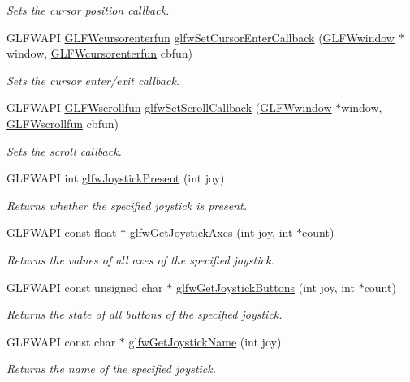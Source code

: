 \begin{DoxyCompactItemize}
\begin{DoxyCompactList}\small\item\em \-Sets the cursor position callback. \end{DoxyCompactList}\item 
\-G\-L\-F\-W\-A\-P\-I \hyperlink{group__input_ga762d898d9b0241d7e3e3b767c6cf318f}{\-G\-L\-F\-Wcursorenterfun} \hyperlink{group__input_gaa20014985561efeb2c53f1956f727830}{glfw\-Set\-Cursor\-Enter\-Callback} (\hyperlink{group__window_ga3c96d80d363e67d13a41b5d1821f3242}{\-G\-L\-F\-Wwindow} $\ast$window, \hyperlink{group__input_ga762d898d9b0241d7e3e3b767c6cf318f}{\-G\-L\-F\-Wcursorenterfun} cbfun)
\begin{DoxyCompactList}\small\item\em \-Sets the cursor enter/exit callback. \end{DoxyCompactList}\item 
\-G\-L\-F\-W\-A\-P\-I \hyperlink{group__input_ga6228cdf94d28fbd3a9a1fbb0e5922a8a}{\-G\-L\-F\-Wscrollfun} \hyperlink{group__input_ga29011514e93368712a3063a28707ced3}{glfw\-Set\-Scroll\-Callback} (\hyperlink{group__window_ga3c96d80d363e67d13a41b5d1821f3242}{\-G\-L\-F\-Wwindow} $\ast$window, \hyperlink{group__input_ga6228cdf94d28fbd3a9a1fbb0e5922a8a}{\-G\-L\-F\-Wscrollfun} cbfun)
\begin{DoxyCompactList}\small\item\em \-Sets the scroll callback. \end{DoxyCompactList}\item 
\-G\-L\-F\-W\-A\-P\-I int \hyperlink{group__input_ga7f81f22f355f4b7d315caf73cdfd9906}{glfw\-Joystick\-Present} (int joy)
\begin{DoxyCompactList}\small\item\em \-Returns whether the specified joystick is present. \end{DoxyCompactList}\item 
\-G\-L\-F\-W\-A\-P\-I const float $\ast$ \hyperlink{group__input_gaab9e573d808b088c5079c0f577d39448}{glfw\-Get\-Joystick\-Axes} (int joy, int $\ast$count)
\begin{DoxyCompactList}\small\item\em \-Returns the values of all axes of the specified joystick. \end{DoxyCompactList}\item 
\-G\-L\-F\-W\-A\-P\-I const unsigned char $\ast$ \hyperlink{group__input_ga3951bea72b5fb4870b1aa0e5c2e9c903}{glfw\-Get\-Joystick\-Buttons} (int joy, int $\ast$count)
\begin{DoxyCompactList}\small\item\em \-Returns the state of all buttons of the specified joystick. \end{DoxyCompactList}\item 
\-G\-L\-F\-W\-A\-P\-I const char $\ast$ \hyperlink{group__input_gac50a4fd9b01886cf9fa2c45f19191fb8}{glfw\-Get\-Joystick\-Name} (int joy)
\begin{DoxyCompactList}\small\item\em \-Returns the name of the specified joystick. \end{DoxyCompactList}\end{DoxyCompactItemize}
